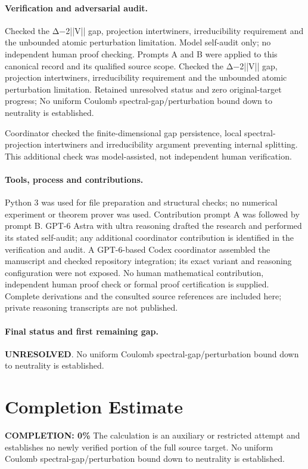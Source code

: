 \documentclass[11pt]{article}
\begin{document}
\paragraph{Verification and adversarial audit.}
Checked the Δ−2||V|| gap, projection intertwiners, irreducibility requirement and the unbounded atomic perturbation limitation. Model self-audit only; no independent human proof checking. Prompts A and B were applied to this canonical record and its qualified source scope. Checked the Δ−2||V|| gap, projection intertwiners, irreducibility requirement and the unbounded atomic perturbation limitation. Retained unresolved status and zero original-target progress; No uniform Coulomb spectral-gap/perturbation bound down to neutrality is established.

Coordinator checked the finite-dimensional gap persistence, local spectral-projection intertwiners and irreducibility argument preventing internal splitting. This additional check was model-assisted, not independent human verification.

\paragraph{Tools, process and contributions.}
Python 3 was used for file preparation and structural checks; no numerical experiment or theorem prover was used. Contribution prompt A was followed by prompt B. GPT-6 Astra with ultra reasoning drafted the research and performed its stated self-audit; any additional coordinator contribution is identified in the verification and audit. A GPT-6-based Codex coordinator assembled the manuscript and checked repository integration; its exact variant and reasoning configuration were not exposed. No human mathematical contribution, independent human proof check or formal proof certification is supplied. Complete derivations and the consulted source references are included here; private reasoning transcripts are not published.

\paragraph{Final status and first remaining gap.}
\textbf{UNRESOLVED}. No uniform Coulomb spectral-gap/perturbation bound down to neutrality is established.

\section{Completion Estimate}
\noindent\textbf{COMPLETION: 0\%}
The calculation is an auxiliary or restricted attempt and establishes no newly verified portion of the full source target. No uniform Coulomb spectral-gap/perturbation bound down to neutrality is established.
\end{document}
